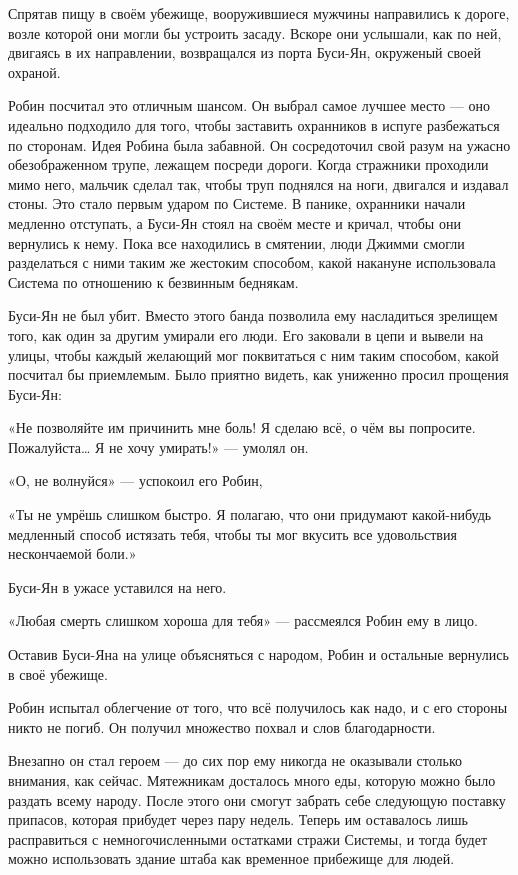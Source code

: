 \documentclass[a5paper, 9pt,
final, openany, twoside=true]{memoir}
\begin{document}
Спрятав пищу в своём убежище, вооружившиеся мужчины направились к дороге, возле которой они могли бы устроить засаду. Вскоре они услышали, как по ней, двигаясь в их направлении, возвращался из порта Буси-Ян, окруженый своей охраной.\bigskip

Робин посчитал это отличным шансом. Он выбрал самое лучшее место — оно идеально подходило для того, чтобы заставить охранников в испуге разбежаться по сторонам. Идея Робина была забавной. Он сосредоточил свой разум на ужасно обезображенном трупе, лежащем посреди дороги. Когда стражники проходили мимо него, мальчик сделал так, чтобы труп поднялся на ноги, двигался и издавал стоны. Это стало первым ударом по Системе. В панике, охранники начали медленно отступать, а Буси-Ян стоял на своём месте и кричал, чтобы они вернулись к нему. Пока все находились в смятении, люди Джимми смогли разделаться с ними таким же жестоким способом, какой накануне использовала Система по отношению к безвинным беднякам.

Буси-Ян не был убит. Вместо этого банда позволила ему насладиться зрелищем того, как один за другим умирали его люди. Его заковали в цепи и вывели на улицы, чтобы каждый желающий мог поквитаться с ним таким способом, какой посчитал бы приемлемым. Было приятно видеть, как униженно просил прощения Буси-Ян:

«Не позволяйте им причинить мне боль! Я сделаю всё, о чём вы попросите. Пожалуйста… Я не хочу умирать!» — умолял он.

«О, не волнуйся» — успокоил его Робин,

«Ты не умрёшь слишком быстро. Я полагаю, что они придумают какой-нибудь медленный способ истязать тебя, чтобы ты мог вкусить все удовольствия нескончаемой боли.»

Буси-Ян в ужасе уставился на него.

«Любая смерть слишком хороша для тебя» — рассмеялся Робин ему в лицо.

Оставив Буси-Яна на улице объясняться с народом, Робин и остальные вернулись в своё убежище.

Робин испытал облегчение от того, что всё получилось как надо, и с его стороны никто не погиб. Он получил множество похвал и слов благодарности.

Внезапно он стал героем — до сих пор ему никогда не оказывали столько внимания, как сейчас. Мятежникам досталось много еды, которую можно было раздать всему народу. После этого они смогут забрать себе следующую поставку припасов, которая прибудет через пару недель. Теперь им оставалось лишь расправиться с немногочисленными остатками стражи Системы, и тогда будет можно использовать здание штаба как временное прибежище для людей.\bigskip
\end{document}
